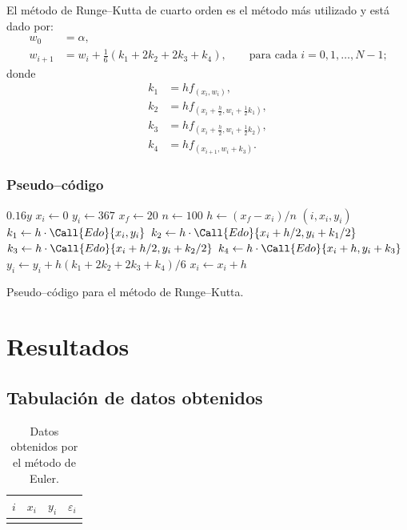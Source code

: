 \documentclass[
    english, spanish, Ce-table, Ce-theorem
]{CabesHW}
\begin{document}
El método de Runge--Kutta de cuarto orden es el método más utilizado y está dado por:
\begin{align*}
    w_0 &= \alpha,\\
    w_{i+1} &= w_i + \frac{1}{6}(k_1 + 2k_2 + 2k_3 + k_4), \qquad \text{para cada $i= 0, 1, \ldots, N-1$;}
\end{align*}
donde
\begin{align*}
    k_1 &= hf_{(x_i, w_i)},\\
    k_2 &= hf_{(x_i + \frac{h}{2}, w_i + \frac{1}{2}k_1)},\\
    k_3 &= hf_{(x_i + \frac{h}{2}, w_i + \frac{1}{2}k_2)},\\
    k_4 &= hf_{(x_{i+1}, w_i + k_3)}.
\end{align*}

\subsubsection{Pseudo--código}
\begin{algorithm}[H]
    \centering
    \begin{myalg}[1]
        \State \Output $0.16 y$
    \EndFunction
    \State \phantom{}
    \State $x_i \gets 0$ 
    \State $y_i \gets 367$ 
    \State $x_f \gets 20$ 
    \State $n \gets 100$ 
    \State \phantom{}
    \State $h \gets (x_f - x_i)/n$ 
        \State \Output $(i, x_i, y_i)$
        \State \phantom{}
        \State $k_1 \gets h\cdot\Call{Edo}{x_i, y_i}$
        \State $k_2 \gets h\cdot\Call{Edo}{x_i+h/2, y_i+k_1/2}$
        \State $k_3 \gets h\cdot\Call{Edo}{x_i+h/2, y_i+k_2/2}$
        \State $k_4 \gets h\cdot\Call{Edo}{x_i+h, y_i+k_3}$
        \State \phantom{}
        \State $y_i \gets y_i + h(k_1 + 2k_2 + 2k_3 + k_4)/6$
        \State $x_i \gets x_i + h$
    \EndFor
    \end{myalg}
    \caption{Pseudo--código para el método de Runge--Kutta.}
    \label{alg:runge-kutta}
\end{algorithm}

\section{Resultados}
\subsection{Tabulación de datos obtenidos}
\begin{table}[H]
    \centering
    \begin{tabular}{c|ccc}
    $i$ & $x_i$ & $y_i$ & $\varepsilon_i$\\[.1em]
    \hline\\[-.9em]
    
    \end{tabular}
    \caption{Datos obtenidos por el método de Euler.}
    \label{tab:euler}
\end{table}
\end{document}
